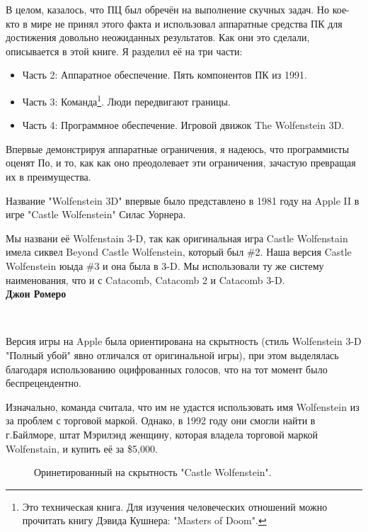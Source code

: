 В целом, казалось, что ПЦ был обречён на выполнение скучных задач. Но кое-кто в мире не принял этого факта и использовал аппаратные средства ПК для достижения довольно неожиданных результатов. Как они это сделали, описывается в этой книге. Я разделил её на три части:
\begin{itemize}
\item Часть 2: Аппаратное обеспечение. Пять компонентов ПК из 1991.
\item Часть 3: Команда\footnote{Это техническая книга. Для изучения человеческих отношений можно прочитать книгу Дэвида Кушнера: "Masters of Doom".}. Люди передвигают границы.
\item Часть 4: Программное обеспечение. Игровой движок The Wolfenstein 3D.
\end{itemize}
\par
Впервые демонстрируя аппаратные ограничения, я надеюсь, что программисты оценят По, и то, как как оно преодолевает эти ограничения, зачастую превращая их в преимущества.\\
\pagebreak



  Название "Wolfenstein 3D" впервые было представлено в 1981 году на Apple II в игре "Castle Wolfenstein" Силас Уорнера.\\
\par
 \begin{fancyquotes}
   Мы названи её Wolfenstain 3-D, так как оригинальная игра Castle Wolfenstain имела сиквел Beyond Castle Wolfenstein, который был \#2. Наша версия Castle Wolfenstein юыда \#3 и она была в 3-D. Мы использовали ту же систему наименования, что и с Catacomb, Catacomb 2 и Catacomb 3-D.
 \bigskip \\
\textbf{Джон Ромеро}
 \end{fancyquotes}
 \\
\par
\par
 \par Версия игры на Apple была ориентирована на скрытность (стиль Wolfenstein 3-D "Полный убой" явно отличался от оригинальной игры), при этом выделялась благодаря использованию оцифрованных голосов, что на тот момент было беспрецендентно.
 \par
 Изначально, команда считала, что им не удастся использовать имя Wolfenstein из за проблем с торговой маркой. Однако, в 1992 году они смогли найти в г.Байлморе, штат Мэрилэнд женщину, которая владела торговой маркой Wolfenstain, и купить её за \$5,000.\\
 \par


\begin{figure}[H]
\centering
{}
\caption{Оринетированный на скрытность "Castle Wolfenstein".}
\end{figure}


